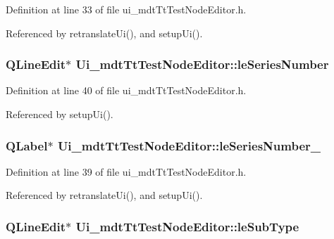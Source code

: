 Definition at line 33 of file ui\-\_\-mdt\-Tt\-Test\-Node\-Editor.\-h.



Referenced by retranslate\-Ui(), and setup\-Ui().

\hypertarget{class_ui__mdt_tt_test_node_editor_ac00d23feaa8b6c0c15e6350b74f105c8}{
\subsubsection[{le\-Series\-Number}]{\setlength{\rightskip}{0pt plus 5cm}Q\-Line\-Edit$\ast$ Ui\-\_\-mdt\-Tt\-Test\-Node\-Editor\-::le\-Series\-Number}}\label{class_ui__mdt_tt_test_node_editor_ac00d23feaa8b6c0c15e6350b74f105c8}


Definition at line 40 of file ui\-\_\-mdt\-Tt\-Test\-Node\-Editor.\-h.



Referenced by setup\-Ui().

\hypertarget{class_ui__mdt_tt_test_node_editor_a37ee38b2300aacc91ded74a23bbcd4a4}{
\subsubsection[{le\-Series\-Number\-\_\-2}]{\setlength{\rightskip}{0pt plus 5cm}Q\-Label$\ast$ Ui\-\_\-mdt\-Tt\-Test\-Node\-Editor\-::le\-Series\-Number\-\_}}\label{class_ui__mdt_tt_test_node_editor_a37ee38b2300aacc91ded74a23bbcd4a4}


Definition at line 39 of file ui\-\_\-mdt\-Tt\-Test\-Node\-Editor.\-h.



Referenced by retranslate\-Ui(), and setup\-Ui().

\hypertarget{class_ui__mdt_tt_test_node_editor_aa13cb2bdfcae8b5180aa45fa692fe2db}{
\subsubsection[{le\-Sub\-Type}]{\setlength{\rightskip}{0pt plus 5cm}Q\-Line\-Edit$\ast$ Ui\-\_\-mdt\-Tt\-Test\-Node\-Editor\-::le\-Sub\-Type}}\label{class_ui__mdt_tt_test_node_editor_aa13cb2bdfcae8b5180aa45fa692fe2db}


